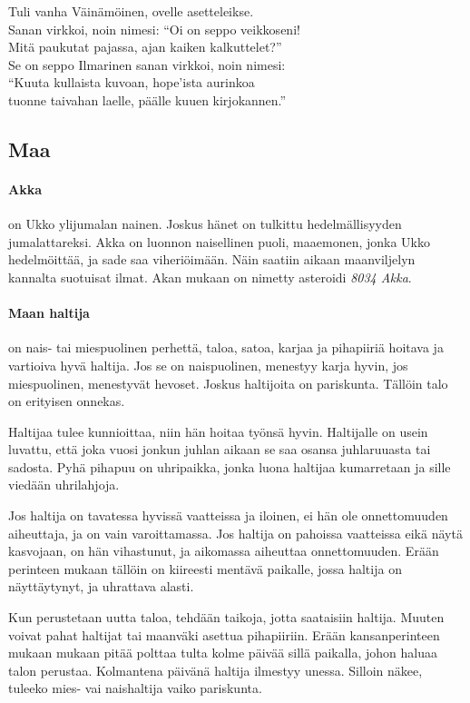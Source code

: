   \begin{center}\begin{em}
    Tuli vanha Väinämöinen, ovelle asetteleikse.\\
    Sanan virkkoi, noin nimesi: ``Oi on seppo veikkoseni!\\
    Mitä paukutat pajassa, ajan kaiken kalkuttelet?''\\
    Se on seppo Ilmarinen sanan virkkoi, noin nimesi:\\
    ``Kuuta kullaista kuvoan, hope'ista aurinkoa\\
    tuonne taivahan laelle, päälle kuuen kirjokannen.''\\
  \end{em}\end{center}


\subsection{Maa}

  \paragraph{Akka} on Ukko ylijumalan nainen. Joskus hänet on tulkittu hedelmällisyyden
    jumalattareksi. Akka on luonnon naisellinen puoli, maaemonen, jonka Ukko hedelmöittää,
    ja sade saa viheriöimään. Näin saatiin aikaan maanviljelyn kannalta suotuisat ilmat.
    Akan mukaan on nimetty asteroidi \emph{8034 Akka}.
  \paragraph{Maan haltija} on nais- tai miespuolinen perhettä, taloa, satoa, karjaa ja pihapiiriä
    hoitava ja vartioiva hyvä haltija. Jos se on naispuolinen, menestyy karja hyvin, jos
    miespuolinen, menestyvät hevoset. Joskus haltijoita on pariskunta. Tällöin talo on erityisen
    onnekas.
    \par
    Haltijaa tulee kunnioittaa, niin hän hoitaa työnsä hyvin. Haltijalle on usein luvattu, että
    joka vuosi jonkun juhlan aikaan se saa osansa juhlaruuasta tai sadosta. Pyhä pihapuu on
    uhripaikka, jonka luona haltijaa kumarretaan ja sille viedään uhrilahjoja.
    \par
    Jos haltija on tavatessa hyvissä vaatteissa ja iloinen, ei hän ole onnettomuuden aiheuttaja,
    ja on vain varoittamassa. Jos haltija on pahoissa vaatteissa eikä näytä kasvojaan, on hän
    vihastunut, ja aikomassa aiheuttaa onnettomuuden. Erään perinteen mukaan tällöin on kiireesti
    mentävä paikalle, jossa haltija on näyttäytynyt, ja uhrattava alasti.
    \par
    Kun perustetaan uutta taloa, tehdään taikoja, jotta saataisiin haltija. Muuten voivat pahat
    haltijat tai maanväki asettua pihapiiriin. Erään kansanperinteen mukaan mukaan pitää polttaa
    tulta kolme päivää sillä paikalla, johon haluaa talon perustaa. Kolmantena päivänä haltija
    ilmestyy unessa. Silloin näkee, tuleeko mies- vai naishaltija vaiko pariskunta.
